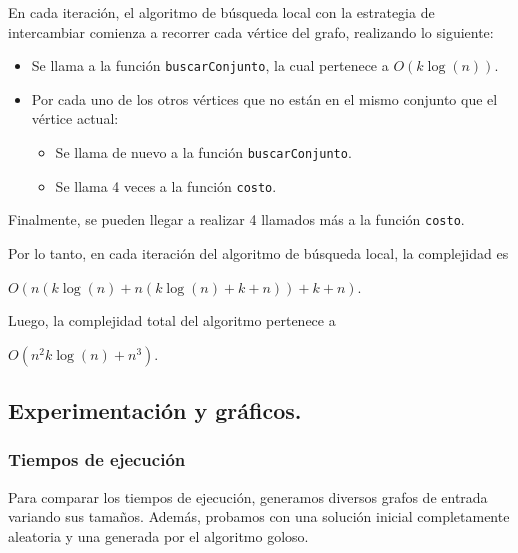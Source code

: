 \vspace*{0.3cm}

En cada iteración, el algoritmo de búsqueda local con la estrategia de
intercambiar comienza a recorrer cada vértice del grafo, realizando lo siguiente:

\begin{itemize}
  \item Se llama a la función \texttt{buscarConjunto}, la cual pertenece a
  $O(k\log(n))$.

  \item Por cada uno de los otros vértices que no están en el mismo conjunto
  que el vértice actual:

  \begin{itemize}
    \item Se llama de nuevo a la función \texttt{buscarConjunto}.

    \item Se llama 4 veces a la función \texttt{costo}.
  \end{itemize}
\end{itemize}

Finalmente, se pueden llegar a realizar 4 llamados más a la función
\texttt{costo}.

Por lo tanto, en cada iteración del algoritmo de búsqueda local, la complejidad
es
\begin{center}
  $O(n (k\log(n) + n (k\log(n) + k + n)) + k + n)$.
\end{center}

\vspace{0.3cm}

Luego, la complejidad total del algoritmo pertenece a
\begin{center}
  $O(n^2k\log(n) + n^3)$.
\end{center}


\newpage \subsection{Experimentación y gráficos.}

\subsubsection{Tiempos de ejecución}

Para comparar los tiempos de ejecución, generamos diversos grafos de entrada
variando sus tamaños. Además, probamos con una solución inicial completamente
aleatoria y una generada por el algoritmo goloso.

